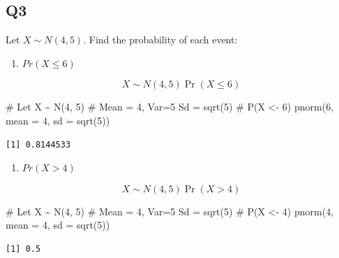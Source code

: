 \documentclass[
]{article}
\newenvironment{Shaded}{\begin{snugshade}}{\end{snugshade}}
\newcommand{\AttributeTok}[1]{\textcolor[rgb]{0.40,0.45,0.13}{#1}}
\newcommand{\CommentTok}[1]{\textcolor[rgb]{0.37,0.37,0.37}{#1}}
\newcommand{\DecValTok}[1]{\textcolor[rgb]{0.68,0.00,0.00}{#1}}
\newcommand{\FunctionTok}[1]{\textcolor[rgb]{0.28,0.35,0.67}{#1}}
\newcommand{\NormalTok}[1]{\textcolor[rgb]{0.00,0.23,0.31}{#1}}
\providecommand{\tightlist}{%
  \setlength{\itemsep}{0pt}\setlength{\parskip}{0pt}}
\begin{document}
\subsection{Q3}\label{q3}

Let \(X\sim N(4,5)\). Find the probability of each event:

\begin{enumerate}
\def\labelenumi{(\alph{enumi})}
\tightlist
\item
  \(Pr(X\leq6)\)
\end{enumerate}

\begin{tcolorbox}[enhanced jigsaw, arc=.35mm, bottomrule=.15mm, breakable, colback=white, colframe=quarto-callout-tip-color-frame, left=2mm, leftrule=.75mm, opacityback=0, rightrule=.15mm, toprule=.15mm]

\[X\sim N(4,5)\Pr(X \leq 6)\]

\begin{Shaded}
\begin{Highlighting}[]
\CommentTok{\# Let X \textasciitilde{} N(4, 5)}
\CommentTok{\# Mean = 4, Var=5 Sd = sqrt(5)}
\CommentTok{\# P(X \textless{}{-} 6)}
\FunctionTok{pnorm}\NormalTok{(}\DecValTok{6}\NormalTok{, }\AttributeTok{mean =} \DecValTok{4}\NormalTok{, }\AttributeTok{sd =} \FunctionTok{sqrt}\NormalTok{(}\DecValTok{5}\NormalTok{))}
\end{Highlighting}
\end{Shaded}

\begin{verbatim}
[1] 0.8144533
\end{verbatim}

\end{tcolorbox}

\begin{enumerate}
\def\labelenumi{(\alph{enumi})}
\setcounter{enumi}{1}
\tightlist
\item
  \(Pr(X>4)\)
\end{enumerate}

\begin{tcolorbox}[enhanced jigsaw, arc=.35mm, bottomrule=.15mm, breakable, colback=white, colframe=quarto-callout-tip-color-frame, left=2mm, leftrule=.75mm, opacityback=0, rightrule=.15mm, toprule=.15mm]

\[X\sim N(4,5)\Pr(X > 4)\]

\begin{Shaded}
\begin{Highlighting}[]
\CommentTok{\# Let X \textasciitilde{} N(4, 5)}
\CommentTok{\# Mean = 4, Var=5 Sd = sqrt(5)}
\CommentTok{\# P(X \textless{}{-} 4)}
\FunctionTok{pnorm}\NormalTok{(}\DecValTok{4}\NormalTok{, }\AttributeTok{mean =} \DecValTok{4}\NormalTok{, }\AttributeTok{sd =} \FunctionTok{sqrt}\NormalTok{(}\DecValTok{5}\NormalTok{))}
\end{Highlighting}
\end{Shaded}

\begin{verbatim}
[1] 0.5
\end{verbatim}

\end{tcolorbox}
\end{document}
